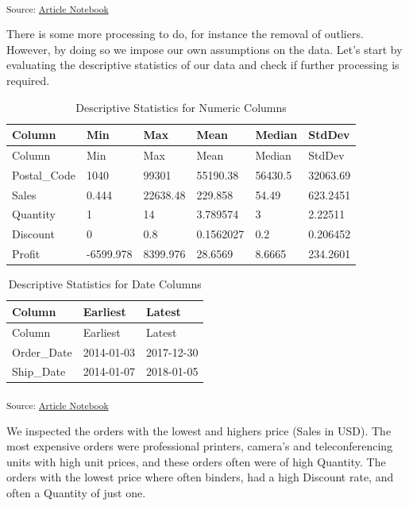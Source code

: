\documentclass[
]{agujournal2019}
\begin{document}
\textsubscript{Source:
\href{https://SJbrou.github.io/Supply_Chain_Data_Analysis/index.qmd.html}{Article
Notebook}}

There is some more processing to do, for instance the removal of
outliers. However, by doing so we impose our own assumptions on the
data. Let's start by evaluating the descriptive statistics of our data
and check if further processing is required.

\begin{longtable}[]{@{}llllll@{}}
\caption{Descriptive Statistics for Numeric Columns}\tabularnewline
\toprule\noalign{}
Column & Min & Max & Mean & Median & StdDev \\
\midrule\noalign{}
\endfirsthead
\toprule\noalign{}
Column & Min & Max & Mean & Median & StdDev \\
\midrule\noalign{}
\endhead
\bottomrule\noalign{}
\endlastfoot
Postal\_Code & 1040 & 99301 & 55190.38 & 56430.5 & 32063.69 \\
Sales & 0.444 & 22638.48 & 229.858 & 54.49 & 623.2451 \\
Quantity & 1 & 14 & 3.789574 & 3 & 2.22511 \\
Discount & 0 & 0.8 & 0.1562027 & 0.2 & 0.206452 \\
Profit & -6599.978 & 8399.976 & 28.6569 & 8.6665 & 234.2601 \\
\end{longtable}

\begin{longtable}[]{@{}lll@{}}
\caption{Descriptive Statistics for Date Columns}\tabularnewline
\toprule\noalign{}
Column & Earliest & Latest \\
\midrule\noalign{}
\endfirsthead
\toprule\noalign{}
Column & Earliest & Latest \\
\midrule\noalign{}
\endhead
\bottomrule\noalign{}
\endlastfoot
Order\_Date & 2014-01-03 & 2017-12-30 \\
Ship\_Date & 2014-01-07 & 2018-01-05 \\
\end{longtable}

\textsubscript{Source:
\href{https://SJbrou.github.io/Supply_Chain_Data_Analysis/index.qmd.html}{Article
Notebook}}

We inspected the orders with the lowest and highers price (Sales in
USD). The most expensive orders were professional printers, camera's and
teleconferencing units with high unit prices, and these orders often
were of high Quantity. The orders with the lowest price where often
binders, had a high Discount rate, and often a Quantity of just one.
\end{document}
